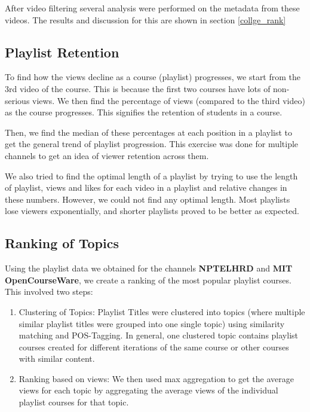 \documentclass{article}
\begin{document}
After video filtering several analysis were performed on the metadata from these videos. The results and discussion for this are shown in section \ref{collge_rank}

\subsection{Playlist Retention}
To find how the views decline as a course (playlist) progresses, we start from the 3rd video of the course. This is because the first two courses have lots of non-serious views. We then find the percentage of views (compared to the third video) as the course progresses. This signifies the retention of students in a course.

Then, we find the median of these percentages at each position in a playlist to get the general trend of playlist progression. This exercise was done for multiple channels to get an idea of viewer retention across them.

We also tried to find the optimal length of a playlist by trying to use the length of playlist, views and likes for each video in a playlist and relative changes in these numbers. However, we could not find any optimal length. Most playlists lose viewers exponentially, and shorter playlists proved to be better as expected.


\subsection{Ranking of Topics}
\label{method_ranking_topics}
Using the playlist data we obtained for the channels \textbf{NPTELHRD} and \textbf{MIT OpenCourseWare}, we create a ranking of the most popular playlist courses. This involved two steps:
\begin{enumerate}
    \item Clustering of Topics: Playlist Titles were clustered into topics (where multiple similar playlist titles were grouped into one single topic) using similarity matching and POS-Tagging. In general, one clustered topic contains playlist courses created for different iterations of the same course or other courses with similar content.\\
    \item Ranking based on views: We then used max aggregation to get the average views for each topic by aggregating the average views of the individual playlist courses for that topic. \\
\end{enumerate}
\end{document}
